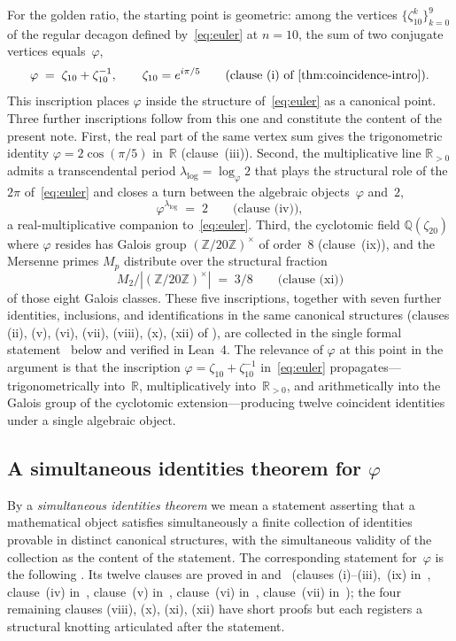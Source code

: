 \documentclass[11pt]{amsart}
\theoremstyle{definition}
\newcommand{\golden}{\varphi}
\newcommand{\Mp}{M_{p}}
\newcommand{\Ztwenty}{(\mathbb{Z}/20\mathbb{Z})^{\times}}
\begin{document}
For the golden ratio, the starting point is geometric: among the
vertices $\{\zeta_{10}^{k}\}_{k=0}^{9}$ of the regular decagon
defined by~\eqref{eq:euler} at $n=10$, the sum of two conjugate
vertices equals~$\golden$,
\[
  \golden \;=\; \zeta_{10}+\zeta_{10}^{-1}, \qquad \zeta_{10}=e^{i\pi/5}
  \qquad\text{(clause (i) of \Cref{thm:coincidence-intro})}.
\]
This inscription places $\golden$ inside the structure
of~\eqref{eq:euler} as a canonical point.  Three further inscriptions
follow from this one and constitute the content of the present note.
First, the real part of the same vertex sum gives the trigonometric
identity $\golden = 2\cos(\pi/5)$ in~$\mathbb{R}$ (clause~(iii)).
Second, the multiplicative line $\mathbb{R}_{>0}$ admits a
transcendental period $\lambda_{\log}=\log_{\golden}2$ that plays the
structural role of the $2\pi$ of~\eqref{eq:euler} and closes a turn
between the algebraic objects~$\golden$ and~$2$,
\[
  \golden^{\lambda_{\log}} \;=\; 2 \qquad\text{(clause (iv))},
\]
a real-multiplicative companion to~\eqref{eq:euler}.  Third, the
cyclotomic field $\mathbb{Q}(\zeta_{20})$ where $\golden$ resides has
Galois group $\Ztwenty$ of order~$8$ (clause~(ix)), and the Mersenne
primes $\Mp$ distribute over the structural fraction
\[
  M_{2}/|\Ztwenty| \;=\; 3/8 \qquad\text{(clause (xi))}
\]
of those eight Galois classes.  These five inscriptions, together
with seven further identities, inclusions, and identifications in the
same canonical structures (clauses (ii), (v), (vi), (vii), (viii),
(x), (xii) of ), are collected in the
single formal statement~ below and
verified in Lean~4.  The relevance of $\golden$ at this point in the
argument is that the inscription $\golden=\zeta_{10}+\zeta_{10}^{-1}$
in~\eqref{eq:euler} propagates---trigonometrically into~$\mathbb{R}$,
multiplicatively into~$\mathbb{R}_{>0}$, and arithmetically into the
Galois group of the cyclotomic extension---producing twelve coincident
identities under a single algebraic object.

\subsection{A simultaneous identities theorem for
\texorpdfstring{$\golden$}{phi}}\label{ssec:coincidence-intro}

By a \emph{simultaneous identities theorem} we mean a statement
asserting that a mathematical object satisfies simultaneously a
finite collection of identities provable in distinct canonical
structures, with the simultaneous validity of the collection as the
content of the statement.  The corresponding statement
for~$\golden$ is the following .  Its
twelve clauses are proved in 
and~ (clauses (i)--(iii),~(ix)
in~, clause~(iv) in~, clause~(v)
in~, clause~(vi)
in~, clause~(vii)
in~); the four remaining clauses (viii), (x),
(xi), (xii) have short proofs but each registers a structural
knotting articulated after the statement.
\end{document}
